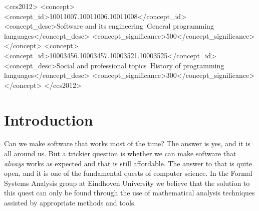 \documentclass[sigplan,10pt,review]{acmart}\settopmatter{printfolios=true,printccs=false,printacmref=false}
\begin{document}
\begin{CCSXML}
<ccs2012>
<concept>
<concept_id>10011007.10011006.10011008</concept_id>
<concept_desc>Software and its engineering~General programming languages</concept_desc>
<concept_significance>500</concept_significance>
</concept>
<concept>
<concept_id>10003456.10003457.10003521.10003525</concept_id>
<concept_desc>Social and professional topics~History of programming languages</concept_desc>
<concept_significance>300</concept_significance>
</concept>
</ccs2012>
\end{CCSXML}





\maketitle


\section{Introduction}
Can we make software that works most of the time? The answer is yes, and it is all around us. 
But a trickier question is whether we can make software that \textit{always} works as expected and that is still affordable.
The answer to that is quite open, and it is one of the fundamental quests of computer science. In the Formal Systems Analysis
group at Eindhoven University we believe that the solution to this quest can only be found through the use of
mathematical analysis techniques assisted by appropriate methods and tools. 
\end{document}
